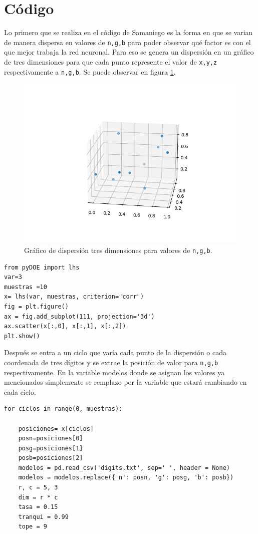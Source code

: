 \documentclass[a4paper, 11pt]{article}
\begin{document}
\section{Código}
Lo primero que se realiza en el código de Samaniego \cite{Edson} es la forma en que se varian de manera dispersa en valores de \texttt{n,g,b} para poder observar qué factor es con el que mejor trabaja la red neuronal. Para eso se genera un dispersión en un gráfico de tres dimensiones para que cada punto represente el valor de \texttt{x,y,z} respectivamente a \texttt{n,g,b}. Se puede observar en figura \ref{f1}.
\begin{figure}[H]
  \centering      
  \includegraphics[scale=.8]{3d.png}
  \caption{Gráfico de dispersión tres dimensiones para valores de \texttt{n,g,b}.}
  \label{f1}
\end{figure}

\begin{verbatim}
from pyDOE import lhs
var=3
muestras =10
x= lhs(var, muestras, criterion="corr")
fig = plt.figure()
ax = fig.add_subplot(111, projection='3d')
ax.scatter(x[:,0], x[:,1], x[:,2])
plt.show()

\end{verbatim}

Después se entra a un ciclo que varía cada punto de la dispersión o cada coordenada de tres dígitos y se extrae la posición de valor para \texttt{n,g,b} respectivamente. En la variable modelos donde se asignan los valores ya mencionados simplemente se remplazo por la variable que estará cambiando en cada ciclo.

\begin{verbatim}
for ciclos in range(0, muestras):

    posiciones= x[ciclos]
    posn=posiciones[0]
    posg=posiciones[1]
    posb=posiciones[2]
    modelos = pd.read_csv('digits.txt', sep=' ', header = None)
    modelos = modelos.replace({'n': posn, 'g': posg, 'b': posb})
    r, c = 5, 3
    dim = r * c
    tasa = 0.15
    tranqui = 0.99
    tope = 9

\end{verbatim}
\end{document}
